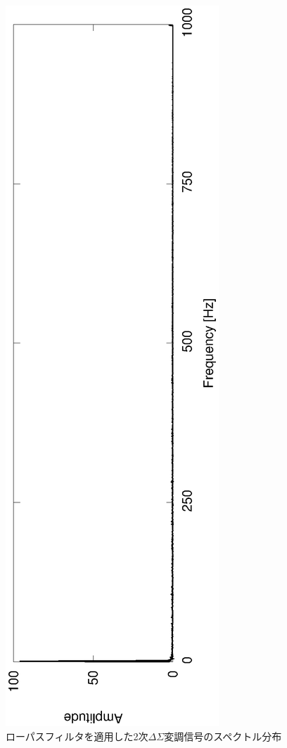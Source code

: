 \documentclass[a4j]{jsarticle}
\begin{document}
\begin{figure}[H]
 \centering
 \vspace{-4cm}
 \hspace{-2cm}
 \includegraphics[angle=-90,scale=0.6]{2ndout_LPF_spec.eps}
  \vspace{-2cm}
 \caption{ローパスフィルタを適用した2次$\Delta\Sigma$変調信号のスペクトル分布}
 \label{2lpfs}
\end{figure}
\end{document}

